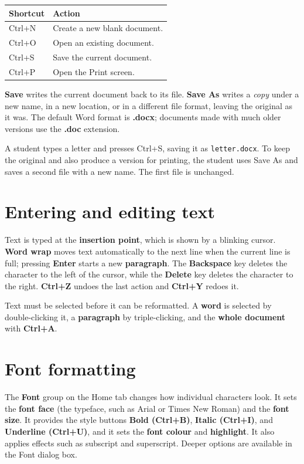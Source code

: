\begin{center}
\begin{tabular}{p{}p{}}
\toprule
\textbf{Shortcut} & \textbf{Action} \\
\midrule
Ctrl+N & Create a new blank document. \\
Ctrl+O & Open an existing document. \\
Ctrl+S & Save the current document. \\
Ctrl+P & Open the Print screen. \\
\bottomrule
\end{tabular}
\end{center}

\textbf{Save} writes the current document back to its file. \textbf{Save As}
writes a \emph{copy} under a new name, in a new location, or in a different
file format, leaving the original as it was. The default Word format is
\textbf{.docx}; documents made with much older versions use the \textbf{.doc}
extension.

\begin{example}
A student types a letter and presses Ctrl+S, saving it as
\texttt{letter.docx}. To keep the original and also produce a version for
printing, the student uses Save As and saves a second file with a new name.
The first file is unchanged.
\end{example}

\section{Entering and editing text}
Text is typed at the \textbf{insertion point}, which is shown by a blinking
cursor. \textbf{Word wrap} moves text automatically to the next line when
the current line is full; pressing \textbf{Enter} starts a new
\textbf{paragraph}. The \textbf{Backspace} key deletes the character to the
left of the cursor, while the \textbf{Delete} key deletes the character to
the right. \textbf{Ctrl+Z} undoes the last action and \textbf{Ctrl+Y} redoes
it.

Text must be selected before it can be reformatted. A \textbf{word} is
selected by double-clicking it, a \textbf{paragraph} by triple-clicking, and
the \textbf{whole document} with \textbf{Ctrl+A}.

\section{Font formatting}
The \textbf{Font} group on the Home tab changes how individual characters
look. It sets the \textbf{font face} (the typeface, such as Arial or Times
New Roman) and the \textbf{font size}. It provides the style buttons
\textbf{Bold (Ctrl+B)}, \textbf{Italic (Ctrl+I)}, and \textbf{Underline
(Ctrl+U)}, and it sets the \textbf{font colour} and \textbf{highlight}. It
also applies effects such as subscript and superscript. Deeper options are
available in the Font dialog box.

